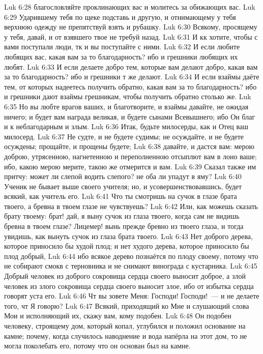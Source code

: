 \vs Luk 6:28 благословляйте проклинающих вас и молитесь за обижающих вас.
\vs Luk 6:29 Ударившему тебя по щеке подставь и другую, и отнимающему у тебя верхнюю одежду не препятствуй взять и рубашку.
\vs Luk 6:30 Всякому, просящему у тебя, давай, и от взявшего твое не требуй назад.
\vs Luk 6:31 И кк хотите, чтобы с вами поступали люди, тк и вы поступайте с ними.
\vs Luk 6:32 И если любите любящих вас, какая вам за то благодарность? ибо и грешники любящих их любят.
\vs Luk 6:33 И если делаете добро тем, которые вам делают добро, какая вам за то благодарность? ибо и грешники т же делают.
\vs Luk 6:34 И если взаймы даёте тем, от которых надеетесь получить обратно, какая вам за то благодарность? ибо и грешники дают взаймы грешникам, чтобы получить обратно столько же.
\vs Luk 6:35 Но вы любте врагов ваших, и благотворите, и взаймы давайте, не ожидая ничего; и будет вам награда великая, и будете сынами Всевышнего; ибо Он благ и к неблагодарным и злым.
\vs Luk 6:36 Итак, будьте милосерды, как и Отец ваш милосерд.
\rsbpar\vs Luk 6:37 Не судте, и не будете судимы; не осуждайте, и не будете осуждены; прощайте, и прощены будете;
\vs Luk 6:38 давайте, и дастся вам: мерою доброю, утрясенною, нагнетенною и переполненною отсыплют вам в лоно ваше; ибо, какою мерою мерите, такою же отмерится и вам.
\vs Luk 6:39 Сказал также им притчу: может ли слепой водить слепого? не оба ли упадут в яму?
\vs Luk 6:40 Ученик не бывает выше своего учителя; но, и усовершенствовавшись, будет всякий, как учитель его.
\vs Luk 6:41 Что ты смотришь на сучок в глазе брата твоего, а бревна в твоем глазе не чувствуешь?
\vs Luk 6:42 Или, как можешь сказать брату твоему: брат! дай, я выну сучок из глаза твоего, когда сам не видишь бревна в твоем глазе? Лицемер! вынь прежде бревно из твоего глаза, и тогда увидишь, как вынуть сучок из глаза брата твоего.
\vs Luk 6:43 Нет доброго дерева, которое приносило бы худой плод; и нет худого дерева, которое приносило бы плод добрый,
\vs Luk 6:44 ибо всякое дерево познаётся по плоду своему, потому что не собирают смокв с терновника и не снимают винограда с кустарника.
\vs Luk 6:45 Добрый человек из доброго сокровища сердца своего выносит доброе, а злой человек из злого сокровища сердца своего выносит злое, ибо от избытка сердца говорят уста его.
\rsbpar\vs Luk 6:46 Чт вы зовете Меня: Господи! Господи!~--- и не делаете того, чт Я говорю?
\vs Luk 6:47 Всякий, приходящий ко Мне и слушающий слова Мои и исполняющий их, скажу вам, кому подобен.
\vs Luk 6:48 Он подобен человеку, строящему дом, который копал, углубился и положил основание на камне; почему, когда случилось наводнение и вода напёрла на этот дом, то не могла поколебать его, потому что он основан был на камне.
